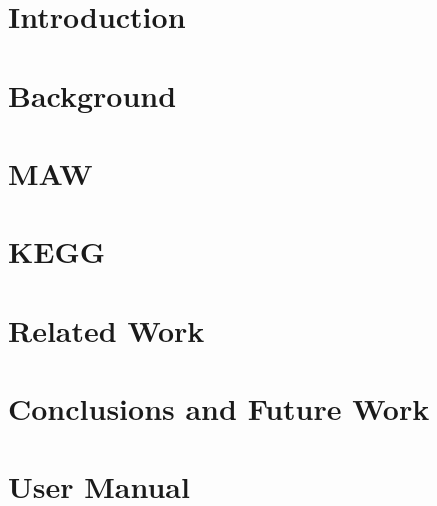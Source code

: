 


\setcounter{page}{1}


\setcounter{tocdepth}{1}
\tableofcontents

\pagebreak

{}
\listoftables

{}
\listoffigures

\doublespace

\pagebreak

\setcounter{page}{1}


\pagebreak

\chapter{Introduction}
\label{ch:introduction}


\chapter{Background}
\label{ch:background}


\chapter{MAW}
\label{ch:maw_smda}


\chapter{KEGG}
\label{ch:kegg}


\chapter{Related Work}
\label{ch:related_work}


\chapter{Conclusions and Future Work}
\label{ch:conclusion}


\appendix

\chapter{\keggapp User Manual}
\label{ch:kegg_manual}







